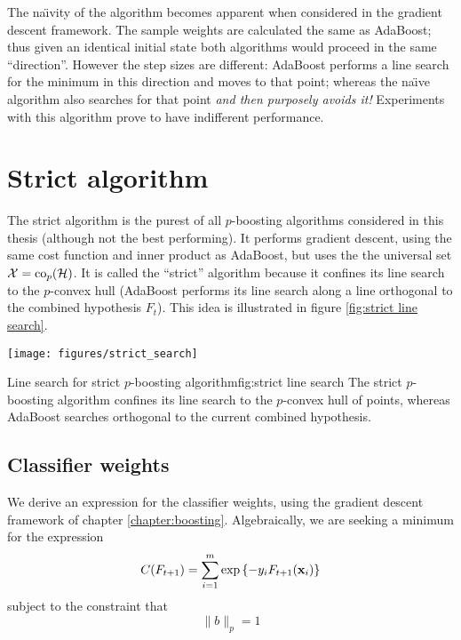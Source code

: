 The na\"{\i}vity of the algorithm becomes apparent when considered in
the gradient descent framework.  The sample weights are calculated
the same as AdaBoost; thus given an identical initial state both
algorithms would proceed in the same ``direction''.  However the step
sizes are different: AdaBoost performs a line search for the minimum
in this direction and moves to that point; whereas the na\"{\i}ve algorithm
also searches for that point \emph{and then purposely avoids it!}
Experiments with this algorithm prove to have indifferent performance.

\section{Strict algorithm}

The strict algorithm is the purest of all $p$-boosting algorithms
considered in this thesis (although not the best performing).  It
performs gradient descent, using the 
same cost function and inner product as AdaBoost, but uses the the
universal set $\mathcal{X} = \mathrm{co}_p(\mathcal{H})$.  It is called the ``strict''
algorithm because it confines its line search to the $p$-convex hull
(AdaBoost performs its line search along a line orthogonal to the
combined hypothesis $F_{t}$).  This idea is illustrated in figure
\ref{fig:strict line search}. 

\begin{linefigure}
\begin{center}
\texttt{[image: figures/strict\_search]}
\end{center}
\begin{capt}{Line search for strict $p$-boosting algorithm}{fig:strict
line search}
The strict $p$-boosting algorithm confines its line search to the
$p$-convex hull of points, whereas AdaBoost searches orthogonal to the
current combined hypothesis.
\end{capt}
\end{linefigure}

\subsection{Classifier weights}

We derive an expression for the classifier weights, using the gradient
descent framework of chapter \ref{chapter:boosting}.  Algebraically, we
are seeking a minimum for the expression 
%
\begin{equation}
\label{eqn:classifier weight cost function approximation}
C(F_{t+1}) = \sum_{i=1}^{m} \exp \left\{ -y_i F_{t+1}(\mathbf{x}_i) \right\}
\end{equation}
%
subject to the constraint that
%
\begin{equation}
\| b \|_{p} = 1
\end{equation}

